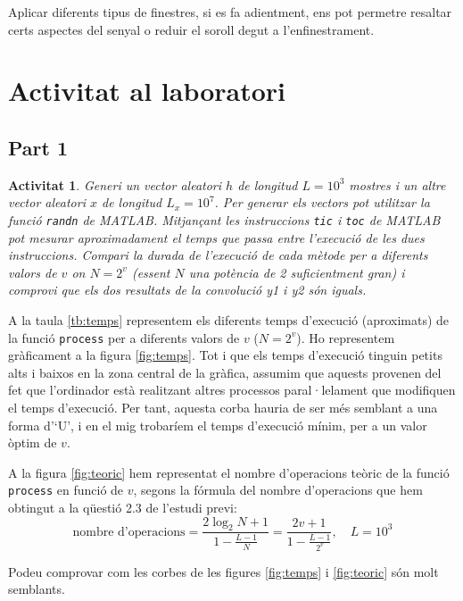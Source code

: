 \documentclass[11pt,a4]{article}
\numberwithin{equation}{section}
\theoremstyle{thmstyle}
\theoremstyle{thmstyle}
\theoremstyle{thmstyle}
\theoremstyle{thmstyle}
\theoremstyle{thmstyle}
\theoremstyle{thmstyle}
\theoremstyle{thmstyle}
\newtheorem{activity}{Activitat}
\begin{document}
Aplicar diferents tipus de finestres, si es fa adientment, ens pot permetre resaltar certs aspectes del senyal o reduir el soroll degut a l'enfinestrament.

\section{Activitat al laboratori}

\subsection{Part 1}

\begin{activity}
Generi un vector aleatori $h$ de longitud $L=10^3$ mostres i un altre vector aleatori $x$ de longitud $L_x=10^7$. Per generar els vectors pot utilitzar la funció {\tt randn} de MATLAB. Mitjançant les instruccions {\tt tic} i {\tt toc} de MATLAB pot mesurar aproximadament el temps que passa entre l’execució de les dues instruccions. Compari la durada de l’execució de cada mètode per a diferents valors de $v$ on $N=2^v$ (essent $N$ una potència de 2 suficientment gran) i comprovi que els dos resultats de la convolució y1 i y2 són iguals.
\end{activity}

A la taula \ref{tb:temps} representem els diferents temps d'execució (aproximats) de la funció {\tt process} per a diferents valors de $v$ ($N = 2^v$). Ho representem gràficament a la figura \ref{fig:temps}. Tot i que els temps d'execució tinguin petits alts i baixos en la zona central de la gràfica, assumim que aquests provenen del fet que l'ordinador està realitzant altres processos paral·lelament que modifiquen el temps d'execució. Per tant, aquesta corba hauria de ser més semblant a una forma d'`U', i en el mig trobaríem el temps d'execució mínim, per a un valor òptim de $v$.

A la figura \ref{fig:teoric} hem representat el nombre d'operacions teòric de la funció {\tt process} en funció de $v$, segons la fórmula del nombre d'operacions que hem obtingut a la qüestió 2.3 de l'estudi previ:
$$
\text{nombre d'operacions} = \frac{2\log_2 N + 1}{1-\frac{L-1}{N}} =
\frac{2v + 1}{1-\frac{L-1}{2^v}}, \quad L = 10^3
$$

Podeu comprovar com les corbes de les figures \ref{fig:temps} i \ref{fig:teoric} són molt semblants.
\end{document}

